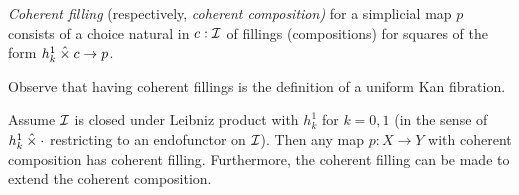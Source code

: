 \documentclass[reqno,10pt,a4paper,oneside]{amsart}
\begin{document}
\begin{definition}
\emph{Coherent filling} (respectively, \emph{coherent composition)} for a simplicial map $p$ consists of a choice natural in $c : \cal{I}$ of fillings (compositions) for squares of the form $h_k^1 \hattimes c \to p$.
\end{definition}

Observe that having coherent fillings is the definition of a uniform Kan fibration.

\begin{lemma}
Assume $\cal{I}$ is closed under Leibniz product with $h_k^1$ for $k = 0, 1$ (in the sense of $h_k^1 \hattimes \arghole$ restricting to an endofunctor on $\cal{I}$).
Then any map $p : X \to Y$ with coherent composition has coherent filling.
Furthermore, the coherent filling can be made to extend the coherent composition.
\end{lemma}
\end{document}
